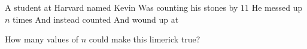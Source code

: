 A student at Harvard named Kevin
Was counting his stones by $11$
He messed up $n$ times
And instead counted 
And wound up at 

How many values of $n$ could make this limerick true?